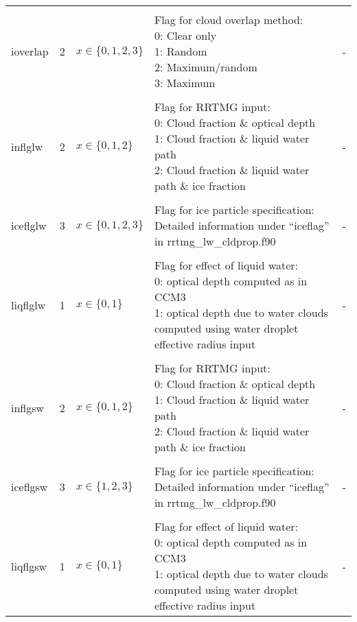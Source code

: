 \documentclass[twoside,11pt,fleqn,a4paper,english,openright]{report}
\begin{document}
\begin{center}
\begin{supertabular}{|l|p{2cm}|p{4cm}|p{6cm}|l|}
  &&&&\\
  ioverlap	& 2	& $x \in \lbrace 0, 1, 2, 3 \rbrace$	& \parbox{6cm}{Flag for cloud overlap method: \\ 
0: Clear only\\
1: Random \\
2: Maximum/random \\
3: Maximum
  }& - \\
  &&&&\\
  inflglw	& 2	& $x \in \lbrace 0, 1, 2 \rbrace$	& \parbox{6cm}{Flag for RRTMG input: \\ 
0: Cloud fraction \& optical depth\\
1: Cloud fraction \& liquid water path \\
2: Cloud fraction \& liquid water path \& ice fraction }& - \\
  &&&&\\
  iceflglw	& 3	& $x \in \lbrace 0, 1, 2, 3 \rbrace$	& \parbox{6cm}{Flag for ice particle specification: \\ 
Detailed information under ``iceflag'' in rrtmg\_lw\_cldprop.f90}& - \\
  &&&&\\
  liqflglw	& 1	& $x \in \lbrace 0, 1 \rbrace$	& \parbox{6cm}{Flag for effect of liquid water: \\ 
0: optical depth computed as in CCM3\\
1: optical depth due to water clouds computed using water droplet effective radius input}& - \\
  &&&&\\
  inflgsw	& 2	& $x \in \lbrace 0, 1, 2 \rbrace$	& \parbox{6cm}{Flag for RRTMG input: \\ 
0: Cloud fraction \& optical depth\\
1: Cloud fraction \& liquid water path \\
2: Cloud fraction \& liquid water path \& ice fraction }& - \\
  &&&&\\
  iceflgsw	& 3	& $x \in \lbrace 1, 2, 3 \rbrace$	& \parbox{6cm}{Flag for ice particle specification: \\ 
Detailed information under ``iceflag'' in rrtmg\_lw\_cldprop.f90}& - \\
  &&&&\\
  liqflgsw	& 1	& $x \in \lbrace 0, 1 \rbrace$	& \parbox{6cm}{Flag for effect of liquid water: \\ 
0: optical depth computed as in CCM3\\
1: optical depth due to water clouds computed using water droplet effective radius input}& - \\

\end{supertabular}
\end{center}
\end{document}
